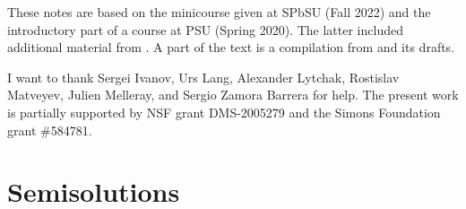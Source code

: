 \documentclass[twoside]{book}
\begin{document}
These notes are based on the minicourse given at SPbSU (Fall 2022) and the introductory part of a course at PSU (Spring 2020).
The latter included additional material from \cite{alexander-kapovitch-petrunin-2019,petrunin2020mnfld,nabutovsky}.
A part of the text is a compilation from \cite{alexander-kapovitch-petrunin-2019, alexander-kapovitch-petrunin-2025, petrunin-yashinski, petrunin-2022-PIGTIKAL, petrunin-zamorabarrera} and its drafts.

I want to thank
Sergei Ivanov,
Urs Lang,
Alexander Lytchak,
Rostislav Matveyev,
Julien Melleray,
and Sergio Zamora Barrera for help.
The present work is partially supported by NSF grant DMS-2005279
and the Simons Foundation grant \#584781.

\thispagestyle{empty}
\tableofcontents
\thispagestyle{empty}






%

\backmatter

\chapter{Semisolutions}

{

\footnotesize
\begin{multicols}{2}







\end{multicols}
}


{\small\sloppy


\def\emph{\textit}

\printbibliography[heading=bibintoc]
\fussy
}
\end{document}
